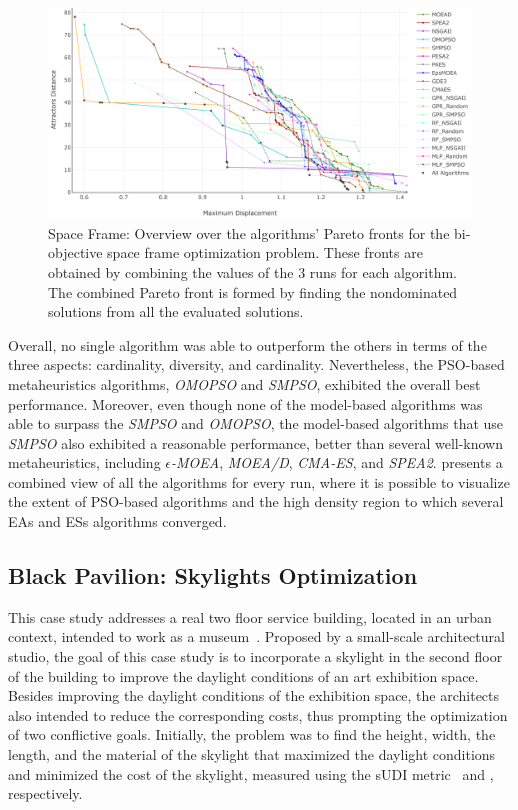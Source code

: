 \begin{figure}[htbp]
	\centering
	\includegraphics[width=\textwidth]{Images/Evaluation/caadria/All_Algorithms_all_runs-2019-04-13_600dpi.png}
	\caption[Space Frame: Overview over the algorithms' Pareto fronts]{Space Frame: Overview over the algorithms' Pareto fronts for the bi-objective space frame optimization problem. These fronts are obtained by combining the values of the 3 runs for each algorithm. The combined Pareto front is formed by finding the nondominated solutions from all the evaluated solutions.}
	\label{fig:allruns}
\end{figure}

Overall, no single algorithm was able to outperform the others in terms of the three aspects: cardinality, diversity, and cardinality. Nevertheless, the \ac{PSO}-based metaheuristics algorithms, \textit{OMOPSO} and \textit{SMPSO}, exhibited the overall best performance. Moreover, even though none of the model-based algorithms was able to surpass the \textit{SMPSO} and \textit{OMOPSO}, the model-based algorithms that use \textit{SMPSO} also exhibited a reasonable performance, better than several well-known metaheuristics, including \textit{$\epsilon$-MOEA}, \textit{MOEA/D}, \textit{CMA-ES}, and \textit{\ac{SPEA2}}.  presents a combined view of all the algorithms for every run, where it is possible to visualize the extent of \ac{PSO}-based algorithms and the high density region to which several \acp{EA} and \acp{ES} algorithms converged.

\subsection{Black Pavilion: Skylights Optimization}

This case study addresses a real two floor service building, located in an urban context, intended to work as a museum~\cite{Caetano2018,IP2019MOO}. Proposed by a small-scale architectural studio, the goal of this case study is to incorporate a skylight in the second floor of the building to improve the daylight conditions of an art exhibition space. Besides improving the daylight conditions of the exhibition space, the architects also intended to reduce the corresponding costs, thus prompting the optimization of two conflictive goals. Initially, the problem was to find the height, width, the length, and the material of the skylight that maximized the daylight conditions and minimized the cost of the skylight, measured using the \ac{sUDI} metric~\cite{Nabil2006} and  , respectively. 

